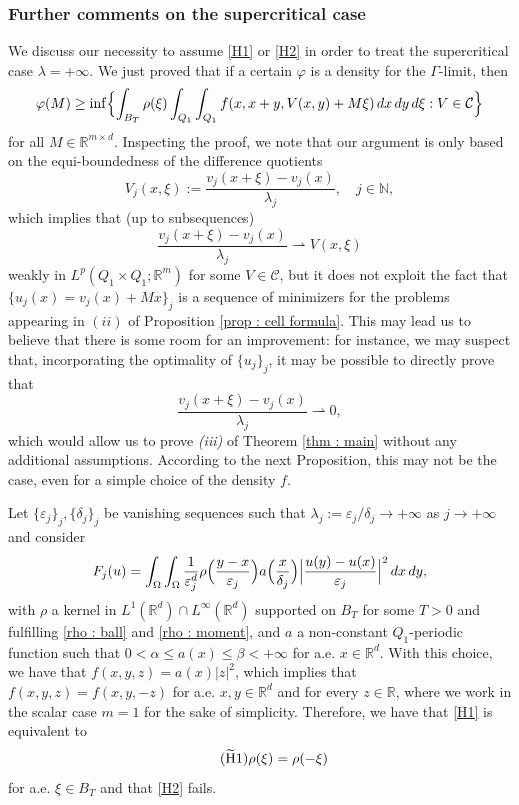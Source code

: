 \documentclass{article}
\theoremstyle{definition}
\newcommand{\e}{\varepsilon}
\newcommand{\f}{\varphi}
\newcommand{\ej}{\varepsilon_j}
\newcommand{\dej}{\delta_j}
\newcommand{\N}{\mathbb{N}}
\newcommand{\R}{\mathbb{R}}
\begin{document}
\subsubsection{Further comments on the supercritical case}

We discuss our necessity to assume \eqref{H1} or \eqref{H2} in order to treat the supercritical case $\lambda=+\infty$. 
We just proved that if a certain $\f$ is a density for the $\Gamma$-limit, then
\begin{equation*}
    \f(M) \geq \inf\Bigl\{ \int_{B_T} \rho(\xi)\int_{Q_1}\int_{Q_1} f(x,x+y,V(x,y)+M\xi)\, dx\,dy\,d\xi : V\in\mathcal{C}\Bigr\}
\end{equation*}
for all $M\in \R^{m\times d}$. Inspecting the proof, we note that our argument is only based on the equi-boundedness of the difference quotients
\begin{equation*}
   V_j(x,\xi):= \frac{v_j(x+\xi)-v_j(x)}{\lambda_j}, \quad j\in\N,
\end{equation*}
which implies that (up to subsequences)
\begin{equation*}
    \frac{v_j(x+\xi)-v_j(x)}{\lambda_j} \rightharpoonup V(x,\xi)
\end{equation*}
weakly in $L^p(Q_1\times Q_1;\R^m)$ for some $V\in\mathcal{C}$,
but it does not exploit the fact that $\{u_j(x)=v_j(x)+Mx\}_j$ is a sequence of minimizers for the problems appearing in $(ii)$ of Proposition \ref{prop : cell formula}. This may lead us to believe that there is some room for an improvement: for instance, we may suspect that, incorporating the optimality of $\{u_j\}_j$, it may be possible to directly prove that 
\begin{equation}\label{zerofinale}
    \frac{v_j(x+\xi)-v_j(x)}{\lambda_j} \rightharpoonup 0,
\end{equation}
which would allow us to prove {\em (iii)} of Theorem \ref{thm : main} without any additional assumptions. According to the next Proposition, this may not be the case, even for a simple choice of the density $f$. 

Let $\{\e_j\}_j, \{\dej\}_j$ be vanishing sequences such that $\lambda_j:=\ej/\dej\to+\infty$ as $j\to+\infty$ and consider
\begin{equation*}
      F_j(u)=\int_\Omega\int_\Omega \frac{1}{\ej^d}\rho\Bigl(\frac{y-x}{\ej}\Bigr)a\Bigl(\frac{x}{\dej}\Bigr)\Bigl|\frac{u(y)-u(x)}{\ej}\Bigr|^2\, dx\,dy,    
\end{equation*}
with $\rho$ a kernel in $L^1(\R^d)\cap L^\infty(\R^d)$ supported on $B_T$ for some $T>0$ and fulfilling \eqref{rho : ball} and \eqref{rho : moment}, and $a$ a non-constant $Q_1$-periodic function such that $0<\alpha\leq a(x)\leq\beta<+\infty$ for a.e. $x\in \R^d$. With this choice, we have that $f(x,y,z)=a(x)|z|^2$, which implies that $f(x,y,z)=f(x,y,-z)$ for a.e. $x,y\in \R^d$ and for every $z\in\R$, where we work in the scalar case $m=1$ for the sake of simplicity. Therefore, we have that \eqref{H1} is equivalent to
\begin{equation}\label{Ht1} \tag{$\rm \widetilde{H}1$}
    \rho(\xi)=\rho(-\xi)
\end{equation}
for a.e. $\xi\in B_T$ and that \eqref{H2} fails.
\end{document}
